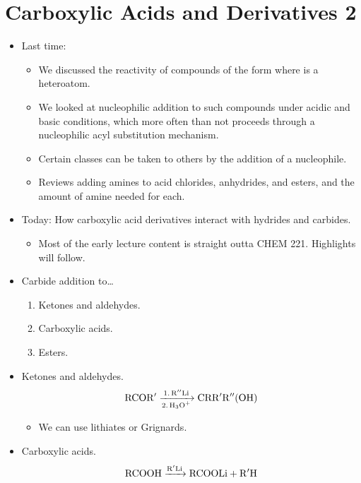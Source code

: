 \documentclass[../notes.tex]{subfiles}
\begin{document}
\section{Carboxylic Acids and Derivatives 2}
\begin{itemize}
    \item {}Last time:
    \begin{itemize}
        \item We discussed the reactivity of compounds of the form  where  is a heteroatom.
        \item We looked at nucleophilic addition to such compounds under acidic and basic conditions, which more often than not proceeds through a nucleophilic acyl substitution mechanism.
        \item Certain classes can be taken to others by the addition of a nucleophile.
        \item Reviews adding amines to acid chlorides, anhydrides, and esters, and the amount of amine needed for each.
    \end{itemize}
    \item Today: How carboxylic acid derivatives interact with hydrides and carbides.
    \begin{itemize}
        \item Most of the early lecture content is straight outta CHEM 221. Highlights will follow.
    \end{itemize}
    \item Carbide addition to\dots
    \begin{enumerate}
        \item Ketones and aldehydes.
        \item Carboxylic acids.
        \item Esters.
    \end{enumerate}
    \item Ketones and aldehydes.
    \begin{equation*}
        \ce{RCOR$'$ ->[1. R$''$Li][2. H3O+] CRR$'$R$''$(OH)}
    \end{equation*}
    \begin{itemize}
        \item We can use lithiates or Grignards.
    \end{itemize}
    \item Carboxylic acids.
    \begin{equation*}
        \ce{RCOOH ->[R$'$Li] RCOOLi + R$'$H}
    \end{equation*}

\end{itemize}
\end{document}
